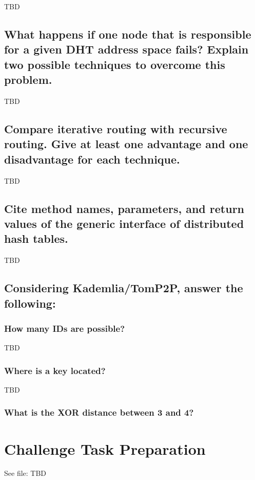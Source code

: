 \documentclass{article}
\begin{document}
TBD

\subsection{What happens if one node that is responsible for a given 
DHT address space fails? Explain two possible techniques to overcome this problem.}

TBD

\subsection{Compare iterative routing with recursive routing. 
Give at least one advantage and one disadvantage for each technique.}

TBD

\subsection{Cite method names, parameters, and return 
values of the generic interface of distributed hash tables.}

TBD

\subsection{Considering Kademlia/TomP2P, answer the following:}
\subsubsection{How many IDs are possible?}

TBD

\subsubsection{Where is a key located?}

TBD

\subsubsection{What is the XOR distance between 3 and 4?}



\section{Challenge Task Preparation}

See file: TBD
\end{document}
